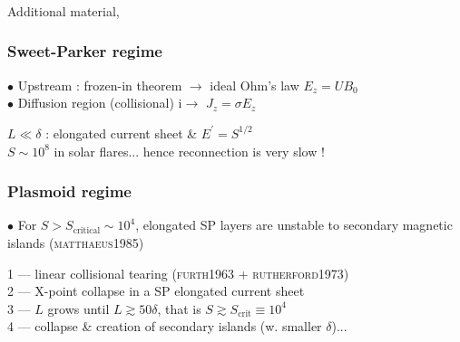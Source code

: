 \documentclass{beamer}
\begin{document}
\begin{frame}
\frametitle{}

{ {\LARGE Additional material,}}

\end{frame}



\begin{frame}
\frametitle{Sweet-Parker regime}

$\bullet$ Upstream : frozen-in theorem $\to$ ideal Ohm's law $E_z = U B_0$ \\[0.2cm]
$\bullet$ Diffusion region (collisional) i$\to$ $J_z = \sigma E_z$ \\

\begin{center}

\end{center}

$L \ll \delta$ : elongated current sheet \& $E^{\prime} = S^{1/2}$ \\[0.2cm]
$S \sim 10^8$ in solar flares... hence reconnection is very slow !

\end{frame}




\begin{frame}
\frametitle{Plasmoid regime}

$\bullet$ For $S > S_{\mathrm{critical}} \sim 10^4$, elongated SP layers are unstable to secondary magnetic islands (\textsc{matthaeus1985}) \\

\begin{center}

\end{center}

1 --- linear collisional tearing (\textsc{furth1963} + \textsc{rutherford1973}) \\[0.2cm]
2 --- X-point collapse in a SP elongated current sheet \\[0.2cm]
3 --- $L$ grows until $L \gtrsim 50 \delta$, that is $S \gtrsim S_{\mathrm{crit}} \equiv 10^4$ \\[0.2cm]
4 --- collapse \& creation of secondary islands (w. smaller $\delta$)...

\end{frame}
\end{document}
